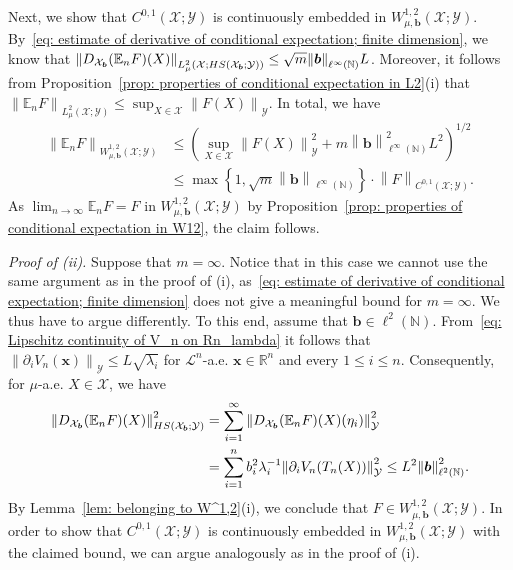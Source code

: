 \documentclass[namedate,webpdf]{ima-authoring-template-blank}
\newcommand*{\HS}{\textup{HS}}
\newcommand*{\nm}[1]{{\left\|#1\right \|}}
\numberwithin{counter}{section}
\numberwithin{equation}{section}
\theoremstyle{plain}
\theoremstyle{definition}
\newcommand*{\cL}{\mathcal{L}}
\newcommand*{\cX}{\mathcal{X}}
\newcommand*{\cY}{\mathcal{Y}}
\newcommand*{\bbE}{\mathbb{E}}
\newcommand*{\bbN}{\mathbb{N}}
\newcommand*{\bbR}{\mathbb{R}}
\theoremstyle{thmstyletwo}
\begin{document}
Next, we show that \(C^{0, 1}(\cX; \cY)\) is continuously embedded in \(W_{\mu, \bm{b}}^{1,2}(\cX;\cY)\). By~\eqref{eq: estimate of derivative of conditional expectation; finite dimension}, we know that \(\nm{D_{\cX_{\bm{b}}} (\bbE_n F)(X)}_{L_{\mu}^2(\cX; \HS(\cX_{\bm{b}}; \cY))} \leq \sqrt{m} \nm{\bm{b}}_{\ell^{\infty}(\bbN)} L\). Moreover, it follows from Proposition~\ref{prop: properties of conditional expectation in L2}(i) that \(\nm{\bbE_n F}_{L_{\mu}^2(\cX; \cY)} \leq \sup_{X \in \cX} \nm{F(X)}_{\cY}\). In total, we have
\begin{align*}
    \nm{\bbE_n F}_{W_{\mu, \bm{b}}^{1,2}(\cX;\cY)} 
    &\leq \left(\sup_{X \in \cX} \nm{F(X)}_{\cY}^2 + m \nm{\bm{b}}_{\ell^{\infty}(\bbN)}^2 L^2 \right)^{1/2} \\
    &\leq \max\left\{1, \sqrt{m} \nm{\bm{b}}_{\ell^{\infty}(\bbN)}\right\} \cdot \nm{F}_{C^{0, 1}(\cX; \cY)}.
\end{align*}
As \(\lim_{n \to \infty} \bbE_n F = F\) in \(W_{\mu, \bm{b}}^{1,2}(\cX;\cY)\) by Proposition~\ref{prop: properties of conditional expectation in W12}, the claim follows.

\emph{Proof of (ii).}
Suppose that \(m = \infty\). Notice that in this case we cannot use the same argument as in the proof of (i), as~\eqref{eq: estimate of derivative of conditional expectation; finite dimension} does not give a meaningful bound for \(m = \infty\). We thus have to argue differently. To this end, assume that \(\bm{b} \in \ell^2(\bbN)\).
From~\eqref{eq: Lipschitz continuity of V_n on Rn_lambda} it follows that \(\nm{\partial_i V_n(\bm{x})}_{\cY} \leq L \sqrt{\lambda_i}\) for \(\cL^n\)-a.e. \(\bm{x} \in \bbR^n\) and every \(1 \leq i \leq n\).
Consequently, for \( \mu \)-a.e. \( X \in \cX \), we have
\begin{align*}
    \nm{D_{\cX_{\bm{b}}} (\bbE_n F)(X)}_{\HS(\cX_{\bm{b}};\cY)}^2 
    &= \sum_{i = 1}^{\infty} \nm{D_{\cX_{\bm{b}}} (\bbE_n F)(X)(\eta_i)}_{\cY}^2 \\
    &= \sum_{i = 1}^n b_i^2 \lambda_i^{-1} \nm{\partial_i V_n(T_n(X))}_{\cY}^2 
    \leq L^2 \nm{\bm{b}}_{\ell^2(\bbN)}^2.
\end{align*}
By Lemma~\ref{lem: belonging to W^1,2}(i), we conclude that \( F \in W_{\mu, \bm{b}}^{1,2}(\cX; \cY) \). In order to show that \(C^{0, 1}(\cX; \cY)\) is continuously embedded in \(W_{\mu, \bm{b}}^{1,2}(\cX;\cY)\) with the claimed bound, we can argue analogously as in the proof of (i). \hfill \qedsymbol{}
\end{document}
